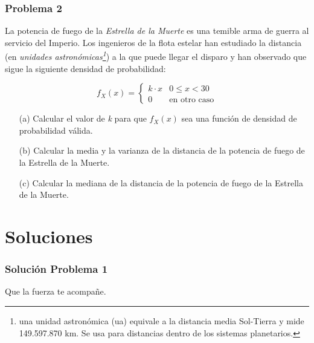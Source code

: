 \documentclass{beamer}
\begin{document}
\begin{frame}
\frametitle{Problema 2 \small{\textit{\color{red}{(adaptado de Virgilio G\'omez-Rubio @precariobecario)}}}}
La potencia de fuego de la \textit{Estrella de la Muerte} es una temible arma de guerra al servicio del Imperio. Los ingenieros de la flota estelar han estudiado la distancia (en \textit{unidades astron\'omicas\footnote{una unidad astron\'omica (ua) equivale a la distancia media Sol-Tierra y mide 149.597.870 km. Se usa para distancias dentro de los sistemas planetarios.}}) a la que puede llegar el disparo y han observado que sigue la siguiente densidad de probabilidad:

\vspace{-0.5cm}
\begin{equation*}
f_{X}(x)=\left\{\begin{array}{ll}
k\cdot x & 0 \leq x< 30 \\
0 & \text{en\ otro\ caso}
\end{array}\right.
\end{equation*}

\begin{itemize}
\item[(a)]Calcular el valor de \textit{k} para que $f_{X}(x)$ sea una funci\'on de densidad de probabilidad v\'alida.
\item[(b)] Calcular la media y la varianza de la distancia de la potencia de fuego de la Estrella de la Muerte.
\item[(c)] Calcular la mediana de la distancia de la potencia de fuego de la Estrella de la Muerte.
\end{itemize}
\end{frame} 

\section{Soluciones} 
\begin{frame}
\frametitle{Soluci\'on Problema 1}
\end{frame}
 
\begin{frame}[plain]
\begin{center}
\Huge Que la fuerza te acompa\~ne.
\end{center}
\end{frame}  
                        
\end{document}
